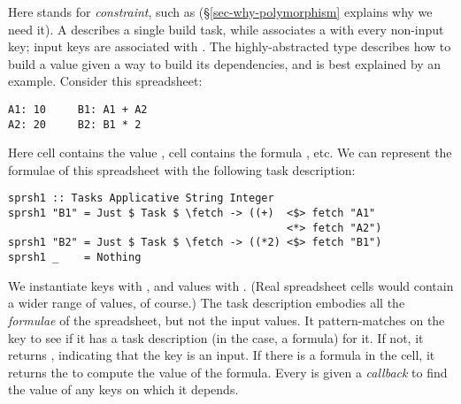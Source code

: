 \noindent
Here  stands for \emph{constraint}, such as 
(\S\ref{sec-why-polymorphism} explains why we need it).
A  describes a single build task, while  associates a
 with every non-input key; input keys are associated with .
The highly-abstracted type  describes how to build a value given
a way to build its dependencies, and is best explained by an example.
Consider this \Excel spreadsheet:

\begin{verbatim}
A1: 10     B1: A1 + A2
A2: 20     B2: B1 * 2
\end{verbatim}

\noindent
Here cell  contains the value , cell  contains the
formula , etc. We can represent the formulae of this spreadsheet
with the following task description:

\vspace{1mm}
\begin{verbatim}
sprsh1 :: Tasks Applicative String Integer
sprsh1 "B1" = Just $ Task $ \fetch -> ((+)  <$> fetch "A1"
                                            <*> fetch "A2")
sprsh1 "B2" = Just $ Task $ \fetch -> ((*2) <$> fetch "B1")
sprsh1 _    = Nothing
\end{verbatim}
\vspace{1mm}

\noindent
We instantiate keys  with , and values  with .
(Real spreadsheet cells would contain a wider range of values, of course.) The
task description  embodies all the \emph{formulae} of the spreadsheet,
but not the input values. It pattern-matches on the key to see if it has a task
description (in the \Excel case, a formula) for it. If not, it returns
, indicating that the key is an input. If there is a formula in the
cell, it returns the  to compute the value of the formula. Every
 is given a \emph{callback}  to find the value of any keys on
which it depends.


